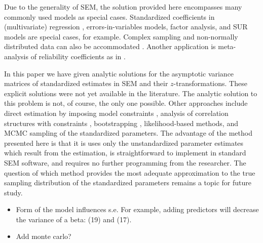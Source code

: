\documentclass[a4paper,11pt]{article}
\newcommand{\0}{\boldsymbol{0}}
\begin{document}
\vspace{12pt}
Due to the generality of SEM, the solution provided here encompasses many commonly used models as special cases. Standardized
coefficients in (multivariate) regression \citep[discussed in ][121]{bollen1990direct}, 
errors-in-variables models, factor analysis, and SUR models are special cases, for example. 
Complex sampling and non-normally distributed data can also be accommodated  \citep{muthen1995complex}. Another  application is meta-analysis of reliability coefficients as in \cite{andrews_construct_1984,scherpenzeel_validity_1997,saris_estimation_2007,alwin_margins_2007}.


In this paper we have given analytic solutions for the asymptotic variance matrices of standardized estimates in SEM and their 
$z$-transformations. These explicit solutions were not yet available in the literature. The analytic solution to this problem is not, of course, the only  one possible. Other approaches include
direct estimation by imposing model constraints \citep{chan2009testing}, analysis of correlation structures with constraints \citep{bentler1983covariance}, bootstrapping , likelihood-based methods, and MCMC sampling of the standardized parameters. The advantage of the method presented here is that it is uses only the unstandardized parameter estimates which result from the estimation, is  straightforward to implement in standard SEM software, and requires no further
programming from the researcher. The question of which 
method provides the most adequate approximation to the true sampling distribution of the standardized parameters  remains
a topic for future study.


\begin{itemize}
\item Form of the model influences s.e. For example, adding predictors will decrease the variance of a beta: (19) and (17).
\item Add monte carlo?
\end{itemize}
\end{document}
